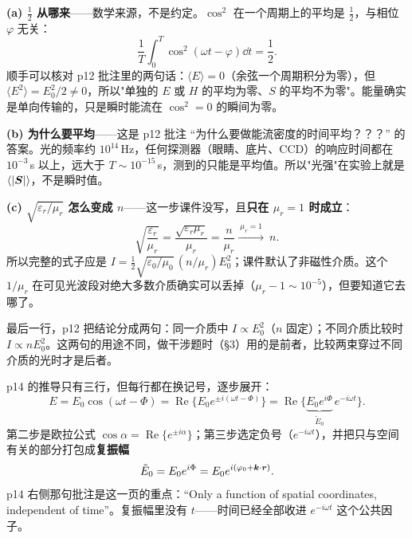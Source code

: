 \documentclass[10pt]{ctexart}
\newcommand{\Ez}{\tilde{E}_0}
\begin{document}
\textbf{(a) $\frac12$ 从哪来}——数学来源，不是约定。$\cos^2$ 在一个周期上的平均是 $\frac12$，与相位 $\varphi$ 无关：
\[
\frac{1}{T}\int_0^T\cos^2(\omega t-\varphi)\dd t=\frac12 .
\]
顺手可以核对 p12 批注里的两句话：$\langle E\rangle=0$（余弦一个周期积分为零），但 $\langle E^2\rangle=E_0^2/2\ne0$，所以"单独的 $E$ 或 $H$ 的平均为零、$S$ 的平均不为零"。能量确实是单向传输的，只是瞬时能流在 $\cos^2=0$ 的瞬间为零。

\textbf{(b) 为什么要平均}——这是 p12 批注 “为什么要做能流密度的时间平均？？？” 的答案。光的频率约 $10^{14}$\,Hz，任何探测器（眼睛、底片、CCD）的响应时间都在 $10^{-3}$\,s 以上，远大于 $T\sim10^{-15}$\,s，测到的只能是平均值。所以"光强"在实验上就是 $\langle|\boldsymbol{S}|\rangle$，不是瞬时值。

\textbf{(c) $\sqrt{\varepsilon_r/\mu_r}$ 怎么变成 $n$}——这一步课件没写，且\textbf{只在 $\mu_r=1$ 时成立}：
\[
\sqrt{\frac{\varepsilon_r}{\mu_r}}=\frac{\sqrt{\varepsilon_r\mu_r}}{\mu_r}=\frac{n}{\mu_r}
\xrightarrow{\ \mu_r=1\ }\ n .
\]
所以完整的式子应是 $I=\frac12\sqrt{\varepsilon_0/\mu_0}\,(n/\mu_r)E_0^2$；课件默认了非磁性介质。这个 $1/\mu_r$ 在可见光波段对绝大多数介质确实可以丢掉（$\mu_r-1\sim10^{-5}$），但要知道它去哪了。


最后一行，p12 把结论分成两句：同一介质中 $I\propto E_0^2$（$n$ 固定）；不同介质比较时 $I\propto nE_0^2$。这两句的用途不同，做干涉题时（§3）用的是前者，比较两束穿过不同介质的光时才是后者。



p14 的推导只有三行，但每行都在换记号，逐步展开：
\[
E=E_0\cos(\omega t-\Phi)
=\operatorname{Re}\big\{E_0e^{\pm i(\omega t-\Phi)}\big\}
=\operatorname{Re}\big\{\underbrace{E_0e^{i\Phi}}_{\Ez}\,e^{-i\omega t}\big\}.
\]
第二步是欧拉公式 $\cos\alpha=\operatorname{Re}\{e^{\pm i\alpha}\}$；第三步选定负号（$e^{-i\omega t}$），并把只与空间有关的部分打包成\textbf{复振幅}
\[
\Ez=E_0e^{i\Phi}=E_0e^{i(\varphi_0+\vect k\cdot\vect r)} .
\]
p14 右侧那句批注是这一页的重点：“Only a function of spatial coordinates, independent of time”。复振幅里没有 $t$——时间已经全部收进 $e^{-i\omega t}$ 这个公共因子。
\end{document}
